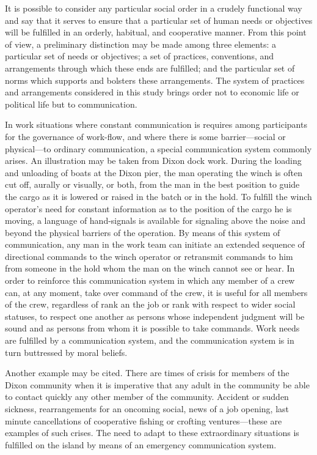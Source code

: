 \documentclass[twoside,symmetric,nobib,justified]{tufte-book}
\begin{document}
It is possible to consider any particular social order in a crudely
functional way and say that it serves to ensure that a particular set of
human needs or objectives will be fulfilled in an orderly, habitual, and
cooperative manner. From this point of view, a preliminary distinction
may be made among three elements: a particular set of needs or
objectives; a set of practices, conventions, and arrangements through
which these ends are fulfilled; and the particular set of norms which
supports and bolsters these arrangements. The system of practices and
arrangements considered in this study brings order not to economic life
or political life but to communication.

In work situations where constant communication is requires among
participants for the governance of work-flow, and where there is some
barrier---social or physical---to ordinary communication, a special
communication system commonly arises. An illustration may be taken from
Dixon dock work. During the loading and unloading of boats at the Dixon
pier, the man operating the winch is often cut off, aurally or visually,
or both, from the man in the best position to guide the cargo as it is
lowered or raised in the batch or in the hold. To fulfill the winch
operator's need for constant information as to the position of the cargo
he is moving, a language of hand-signals is available for signaling
above the noise and beyond the physical barriers of the operation. By
means of this system of communication, any man in the work team can
initiate an extended sequence of directional commands to the winch
operator or retransmit commands to him from someone in the hold whom the
man on the winch cannot see or hear. In order to reinforce this
communication system in which any member of a crew can, at any moment,
take over command of the crew, it is useful for all members of the crew,
regardless of rank an the job or rank with respect to wider social
statuses, to respect one another as persons whose independent judgment
will be sound and as persons from whom it is possible to take commands.
Work needs are fulfilled by a communication system, and the
communication system is in turn buttressed by moral beliefs.

Another example may be cited. There are times of crisis for members of
the Dixon community when it is imperative that any adult in the
community be able to contact quickly any other member of the community.
Accident or sudden sickness, rearrangements for an oncoming social, news
of a job opening, last minute cancellations of cooperative fishing or
crofting ventures---these are examples of such crises. The need to adapt
to these extraordinary situations is fulfilled on the island by means of
an emergency communication system.
\end{document}
